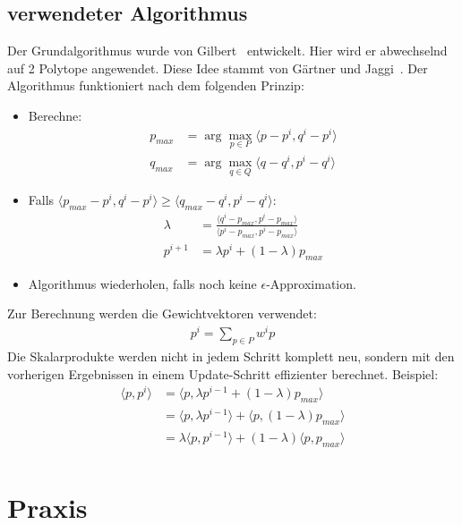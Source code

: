 \documentclass{scrartcl}
\begin{document}
\subsection{verwendeter Algorithmus}
Der Grundalgorithmus wurde von Gilbert~\cite{eggilbert} entwickelt. 
Hier wird er abwechselnd auf 2 Polytope angewendet. 
Diese Idee stammt von Gärtner und Jaggi~\cite{jaggi}.
Der Algorithmus funktioniert nach dem folgenden Prinzip:
\begin{itemize}
\item Berechne:
\begin{align}
p_{max} &=\arg\max_{p \in P} \langle p - p^i, q^i - p^i \rangle \\
q_{max} &=\arg\max_{q \in Q} \langle q - q^i, p^i - q^i \rangle
\end{align}
\item Falls $ \langle p_{max} - p^i, q^i - p^i \rangle \geq \langle q_{max} - q^i, p^i - q^i \rangle$:
\begin{align}
\lambda&= \frac{\langle q^i-p_{max},p^i-p_{max}\rangle}{\langle p^i-p_{max},p^i-p_{max}\rangle}\\  
p^{i+1} &= \lambda p^i + (1 - \lambda) p_{max}
\end{align}
\item Algorithmus wiederholen, falls noch keine $\epsilon$-Approximation.
\end{itemize}
Zur Berechnung werden die Gewichtvektoren verwendet:
\begin{align}
p^i = \sum_{p \in P} w^i p
\end{align}
Die Skalarprodukte werden nicht in jedem Schritt komplett neu, sondern mit den vorherigen Ergebnissen in einem Update-Schritt effizienter berechnet.
Beispiel:
\begin{align}
\langle p , p^i \rangle &= \langle p , \lambda p^{i-1} + (1-\lambda) p_{max} \rangle \\
&= \langle p, \lambda p^{i-1} \rangle + \langle p, (1-\lambda) p_{max} \rangle \\
&= \lambda \langle p, p^{i-1} \rangle + (1-\lambda) \langle p, p_{max} \rangle \\
\end{align}

\section{Praxis}
\end{document}
